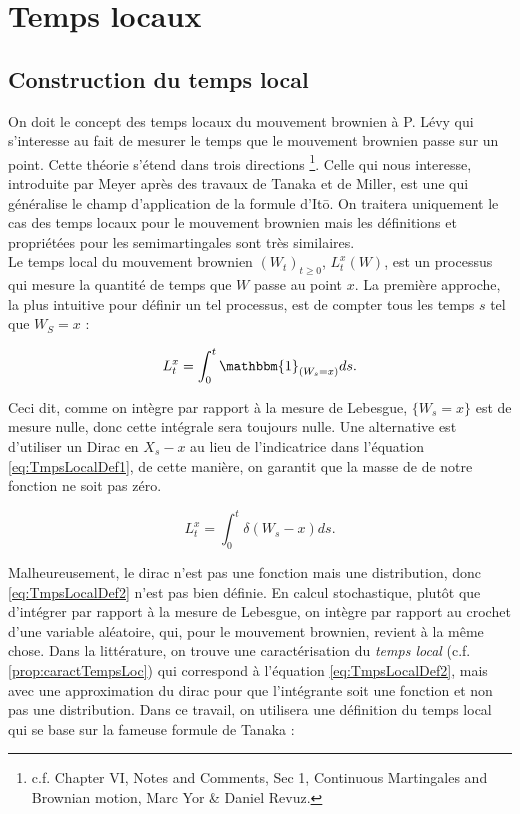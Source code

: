\documentclass[openany]{book}
\newcommand{\1}{\mathbbm{1}}
\theoremstyle{thmfont}
\theoremstyle{deffont}
\theoremstyle{thmfont}
\theoremstyle{deffont}
\begin{document}
\chapter{Temps locaux}

\section{Construction du temps local}\label{sec:ConstrTempsLoc}

On doit le concept des temps locaux du mouvement brownien à P. Lévy qui s'interesse au fait de mesurer le temps que le mouvement brownien passe sur un point. Cette théorie s'étend dans trois directions
\footnote{c.f. Chapter VI, Notes and Comments, Sec 1, Continuous Martingales and Brownian motion, Marc Yor \& Daniel Revuz.}.
Celle qui nous interesse, introduite par Meyer après des travaux de Tanaka et de Miller, est une qui généralise le champ d'application de la formule d'Itō. On traitera uniquement le cas des temps locaux pour le mouvement brownien mais les définitions et propriétées pour les semimartingales sont très similaires.\\

Le temps local du mouvement brownien $(W_t)_{t\geq0}$, $L_t^x(W)$, est un processus qui mesure la quantité de temps que $W$ passe au point $x$.
La première approche, la plus intuitive pour définir un tel processus, est de compter tous les temps $s$ tel que $W_S = x$ :

\begin{equation}
  \label{eq:TmpsLocalDef1}
   L^x_t= \int_0^t\1_{(W_s=x)}ds.
  \end{equation}

  Ceci dit, comme on intègre par rapport à la mesure de Lebesgue, $\{W_s = x\}$ est de mesure nulle, donc cette intégrale sera toujours nulle. Une alternative est d'utiliser un Dirac en $X_s - x$ au lieu de l'indicatrice dans l'équation \eqref{eq:TmpsLocalDef1}, de cette manière, on garantit que la masse de de notre fonction ne soit pas zéro.

\begin{equation}
  \label{eq:TmpsLocalDef2}
  L^x_t= \int_0^t\delta(W_s-x)ds.
\end{equation}

Malheureusement, le dirac n'est pas une fonction mais une distribution, donc \eqref{eq:TmpsLocalDef2} n'est pas bien définie. En calcul stochastique, plutôt que d'intégrer par rapport à la mesure de Lebesgue, on intègre par rapport au crochet d'une variable aléatoire, qui, pour le mouvement brownien, revient à la même chose. Dans la littérature, on trouve une caractérisation du \textit{temps local} (c.f. \autoref{prop:caractTempsLoc}) qui correspond à l'équation \eqref{eq:TmpsLocalDef2}, mais avec une approximation du dirac pour que l'intégrante soit une fonction et non pas une distribution. Dans ce travail, on utilisera une définition du temps local qui se base sur la fameuse formule de Tanaka :\\
\end{document}
